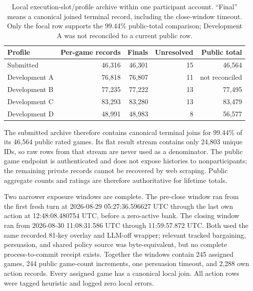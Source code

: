 \begin{table}[h]
\centering
\small
\caption{Local execution-slot/profile archive within one participant account.
``Final'' means a canonical joined terminal record, including the close-window
timeout. Only the focal row supports the 99.44\% public-total comparison; Development A was not
reconciled to a current public row.}
\label{tab:archive_coverage}
\begin{tabular}{@{}lrrrr@{}}
\toprule
Profile & Per-game records & Finals & Unresolved & Public total \\
\midrule
Submitted & 46,316 & 46,301 & 15 & 46,564 \\
Development A & 76,818 & 76,807 & 11 & not reconciled \\
Development B & 77,235 & 77,222 & 13 & 77,495 \\
Development C & 83,293 & 83,280 & 13 & 83,479 \\
Development D & 48,991 & 48,983 & 8 & 56,577 \\
\bottomrule
\end{tabular}
\end{table}

The submitted archive therefore contains canonical terminal joins for 99.44\%
of its 46,564 public rated games. Its flat result stream contains only 24,803
unique IDs, so
raw rows from that stream are never used as a denominator. The public game
endpoint is authenticated and does not expose histories to nonparticipants;
the remaining private records cannot be recovered by web scraping. Public
aggregate counts and ratings are therefore authoritative for lifetime totals.

Two narrower exposure windows are complete. The pre-close window ran from the
first fresh turn at 2026-08-29 05:27:36.596627 UTC through the last own action
at 12:48:08.480754 UTC, before a zero-active bank. The closing window ran from
2026-08-30 11:08:31.586 UTC through 11:59:57.872 UTC. Both used the same
recorded 81-key overlay and LLM-off wrapper; relevant tracked bargaining,
persuasion, and shared policy source was byte-equivalent, but no complete
process-to-commit receipt exists. Together the windows contain 245 assigned
games, 244 public game-count increments, one persuasion timeout, and 2,288 own
action records. Every assigned game has a canonical local join. All action
rows were tagged heuristic and logged zero local errors.

